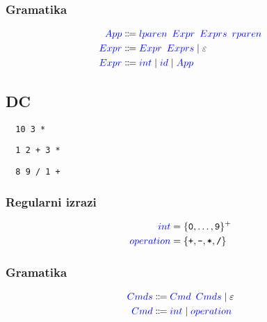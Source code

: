 \documentclass{article}
\newcommand{\Symbol}[1]{\textcolor{blue}{#1}}
\newcommand{\Null}{\varepsilon}
\newcommand{\Char}[1]{\texttt{#1}}
\newcommand{\Arrow}{\Coloneq}
\newcommand{\Seq}{{\ \,}}
\newcommand{\Union}{\mathrel{|}}
\newcommand{\KleenePlus}[1]{#1^+}
\begin{document}
\subsubsection*{Gramatika}
\begin{equation*}
  \begin{aligned}
    \Symbol{App} &\Arrow \Symbol{lparen} \Seq \Symbol{Expr} \Seq \Symbol{Exprs} \Seq \Symbol{rparen}\\
    \Symbol{Expr} &\Arrow \Symbol{Expr} \Seq \Symbol{Exprs} \Union \Null\\
    \Symbol{Expr} &\Arrow \Symbol{int} \Union \Symbol{id} \Union \Symbol{App}
  \end{aligned}
\end{equation*}

\subsection{DC}
\begin{verbatim}
  10 3 *
\end{verbatim}
\begin{verbatim}
  1 2 + 3 *
\end{verbatim}
\begin{verbatim}
  8 9 / 1 +
\end{verbatim}

\subsubsection*{Regularni izrazi}
\begin{equation*}
  \begin{aligned}
    \Symbol{int} &= \KleenePlus{\{\Char{0}, \dots, \Char{9}\}}\\
    \Symbol{operation} &= \{\Char{+}, \Char{-}, \Char{*}, \Char{/}\}
  \end{aligned}
\end{equation*}

\subsubsection*{Gramatika}
\begin{equation*}
  \begin{aligned}
    \Symbol{Cmds} &\Arrow \Symbol{Cmd} \Seq \Symbol{Cmds} \Union \Null \\
    \Symbol{Cmd} &\Arrow \Symbol{int} \Union \Symbol{operation}\\
  \end{aligned}
\end{equation*}
\end{document}
